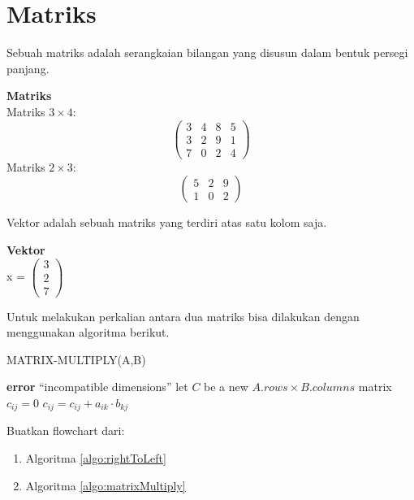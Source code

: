 \section{Matriks}
Sebuah matriks adalah serangkaian bilangan yang disusun dalam bentuk persegi panjang. 
\begin{contoh}
\textbf{Matriks}\\
	Matriks $3\times4$: 
	\begin{displaymath}
		\left(
		\begin{array}{cccc}
			3 & 4 & 8 & 5 \\
			3 & 2 & 9 & 1 \\
			7 & 0 & 2 & 4 
		\end{array}
		\right)
	\end{displaymath}
	Matriks $2\times3$:
	\begin{displaymath}
		\left(
		\begin{array}{ccc}
			5 & 2 & 9 \\
			1 & 0 & 2 
		\end{array}
		\right)
	\end{displaymath}
\end{contoh} 
Vektor adalah sebuah matriks yang terdiri atas satu kolom saja.
\begin{contoh}
	\textbf{Vektor}\\
	x =
	\begin{math}
		\left(
		\begin{array}{c}
			3 \\
			2 \\
			7 
		\end{array}
		\right)
	\end{math}
\end{contoh}

Untuk melakukan perkalian antara dua matriks bisa dilakukan dengan menggunakan algoritma berikut.
\begin{algorithm}[H]
	\caption{MATRIX-MULTIPLY(A,B)}
	\label{algo:matrixMultiply}
	\begin{algorithmic}[1]
			\STATE \textbf{error} ``incompatible dimensions''
		\ELSE
			\STATE let $C$ be a new $A.rows\times{}B.columns$ matrix
					\STATE $c_{ij}=0$
						\STATE $c_{ij} = c_{ij} + a_{ik} \cdot b_{kj}$
					\ENDFOR
				\ENDFOR
			\ENDFOR
		\ENDIF
	\end{algorithmic}
\end{algorithm}

\FloatBarrier
\begin{konsep}
Buatkan flowchart dari:
\begin{enumerate}
	\item Algoritma \ref{algo:rightToLeft}\\
	\item Algoritma \ref{algo:matrixMultiply}\\
\end{enumerate}
\end{konsep}

